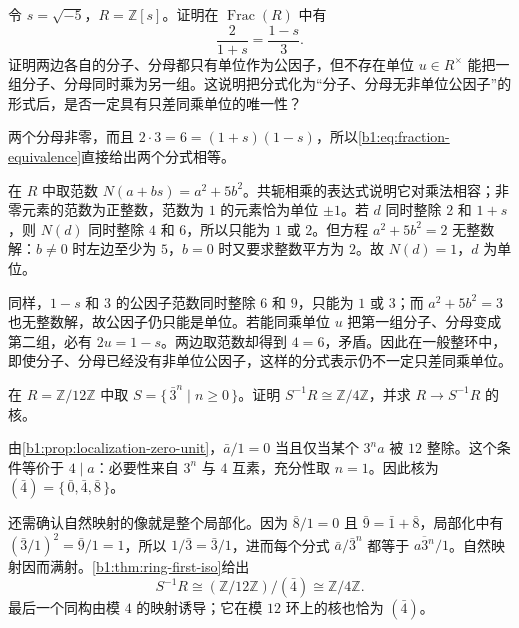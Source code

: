 \begin{exercise}\label{b1:ex:13-13}
	令 \(s=\sqrt{-5}\)，\(R=\mathbb Z[s]\)。证明在 \(\operatorname{Frac}(R)\) 中有
	\[
		\frac{2}{1+s}=\frac{1-s}{3}.
	\]
	证明两边各自的分子、分母都只有单位作为公因子，但不存在单位 \(u\in R^\times\) 能把一组分子、分母同时乘为另一组。这说明把分式化为“分子、分母无非单位公因子”的形式后，是否一定具有只差同乘单位的唯一性？
\end{exercise}
\begin{solution}
	两个分母非零，而且 \(2\cdot3=6=(1+s)(1-s)\)，所以\eqref{b1:eq:fraction-equivalence}直接给出两个分式相等。

	在 \(R\) 中取范数 \(N(a+bs)=a^2+5b^2\)。共轭相乘的表达式说明它对乘法相容；非零元素的范数为正整数，范数为 \(1\) 的元素恰为单位 \(\pm1\)。若 \(d\) 同时整除 \(2\) 和 \(1+s\)，则 \(N(d)\) 同时整除 \(4\) 和 \(6\)，所以只能为 \(1\) 或 \(2\)。但方程 \(a^2+5b^2=2\) 无整数解：\(b\neq0\) 时左边至少为 \(5\)，\(b=0\) 时又要求整数平方为 \(2\)。故 \(N(d)=1\)，\(d\) 为单位。

	同样，\(1-s\) 和 \(3\) 的公因子范数同时整除 \(6\) 和 \(9\)，只能为 \(1\) 或 \(3\)；而 \(a^2+5b^2=3\) 也无整数解，故公因子仍只能是单位。若能同乘单位 \(u\) 把第一组分子、分母变成第二组，必有 \(2u=1-s\)。两边取范数却得到 \(4=6\)，矛盾。因此在一般整环中，即使分子、分母已经没有非单位公因子，这样的分式表示仍不一定只差同乘单位。
\end{solution}

\begin{exercise}\label{b1:ex:13-2}
	在 \(R=\mathbb Z/12\mathbb Z\) 中取 \(S=\{\,\bar3^n\mid n\geq0\,\}\)。证明 \(S^{-1}R\cong\mathbb Z/4\mathbb Z\)，并求 \(R\rightarrow S^{-1}R\) 的核。
\end{exercise}
\begin{solution}
	由\cref{b1:prop:localization-zero-unit}，\(\bar a/1=0\) 当且仅当某个 \(3^na\) 被 \(12\) 整除。这个条件等价于 \(4\mid a\)：必要性来自 \(3^n\) 与 \(4\) 互素，充分性取 \(n=1\)。因此核为 \((\bar4)=\{\,\bar0,\bar4,\bar8\,\}\)。

	还需确认自然映射的像就是整个局部化。因为 \(\bar8/1=0\) 且 \(\bar9=\bar1+\bar8\)，局部化中有 \((\bar3/1)^2=\bar9/1=1\)，所以 \(1/\bar3=\bar3/1\)，进而每个分式 \(\bar a/\bar3^n\) 都等于 \(\overline{a3^n}/1\)。自然映射因而满射。\cref{b1:thm:ring-first-iso}给出
	\[
		S^{-1}R\cong(\mathbb Z/12\mathbb Z)/(\bar4) \cong\mathbb Z/4\mathbb Z.
	\]
	最后一个同构由模 \(4\) 的映射诱导；它在模 \(12\) 环上的核也恰为 \((\bar4)\)。
\end{solution}

